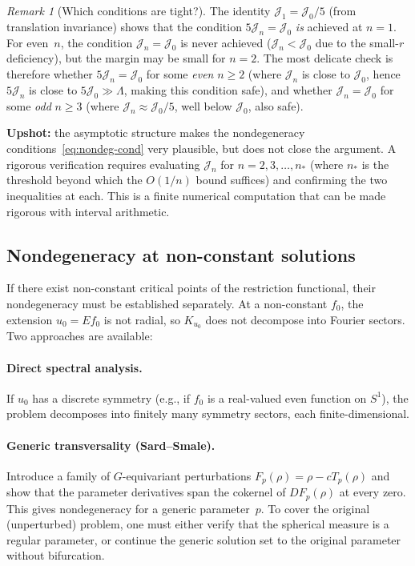 \documentclass[12pt]{article}
\theoremstyle{definition}
\theoremstyle{remark}
\newtheorem{remark}[theorem]{Remark}
\begin{document}
\begin{remark}[Which conditions are tight?]
  The identity $\mathcal J_1=\mathcal J_0/5$ (from translation invariance)
  shows that the condition $5\mathcal J_n=\mathcal J_0$ \emph{is} achieved
  at $n=1$.  For even~$n$, the condition $\mathcal J_n=\mathcal J_0$ is
  never achieved ($\mathcal J_n<\mathcal J_0$ due to the small-$r$
  deficiency), but the margin may be small for $n=2$.  The most delicate
  check is therefore whether $5\mathcal J_n=\mathcal J_0$ for some
  \emph{even} $n\geq 2$ (where $\mathcal J_n$ is close to $\mathcal J_0$,
  hence $5\mathcal J_n$ is close to $5\mathcal J_0\gg\Lambda$, making
  this condition safe), and whether $\mathcal J_n=\mathcal J_0$ for some
  \emph{odd} $n\geq 3$ (where $\mathcal J_n\approx\mathcal J_0/5$, well
  below $\mathcal J_0$, also safe).

  \textbf{Upshot:} the asymptotic structure makes the nondegeneracy
  conditions~\eqref{eq:nondeg-cond} very plausible, but does not close the
  argument.  A rigorous verification requires evaluating $\mathcal J_n$ for
  $n=2,3,\ldots,n_*$ (where $n_*$ is the threshold beyond which the
  $O(1/n)$ bound suffices) and confirming the two inequalities at each.
  This is a finite numerical computation that can be made rigorous with
  interval arithmetic.
\end{remark}

\subsection{Nondegeneracy at non-constant solutions}
\label{sec:nondeg-nonconst}

If there exist non-constant critical points of the restriction functional,
their nondegeneracy must be established separately.  At a non-constant
$f_0$, the extension $u_0=Ef_0$ is not radial, so $K_{u_0}$ does not
decompose into Fourier sectors.  Two approaches are available:

\paragraph{Direct spectral analysis.}
If $u_0$ has a discrete symmetry (e.g., if $f_0$ is a real-valued
even function on $S^1$), the problem decomposes into finitely many
symmetry sectors, each finite-dimensional.

\paragraph{Generic transversality (Sard--Smale).}
Introduce a family of $G$-equivariant perturbations $F_p(\rho)=\rho-cT_p(\rho)$
and show that the parameter derivatives span the cokernel of $DF_p(\rho)$
at every zero.  This gives nondegeneracy for a generic parameter~$p$.
To cover the original (unperturbed) problem, one must either verify that
the spherical measure is a regular parameter, or continue the generic
solution set to the original parameter without bifurcation.
\end{document}

